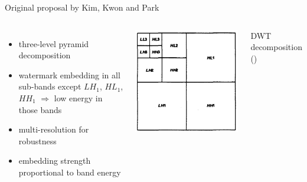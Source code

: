 \begin{frame}{\insertsection}{Original proposal by Kim, Kwon and Park}
	\begin{columns}[T]
	\begin{itemize}
	\item three-level pyramid decomposition
	\item watermark embedding in all sub-bands except $LH_1$, $HL_1$, $HH_1$
	\newline \textcolor{TUDblue}{$\Rightarrow$} low energy in those bands
	\item multi-resolution for robustness
	\item embedding strength proportional to band energy
	\end{itemize}
	\centering
	\includegraphics[width=.8\textwidth]{Bilder/threelayerMotivation} 
	
	DWT decomposition (\cite{779947})
	\end{columns} 	
\end{frame}

